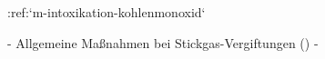 :ref:`m-intoxikation-kohlenmonoxid`
\begin{itemize}
    -   Allgemeine Maßnahmen bei
Stickgas-Vergiftungen
()
-   
\end{itemize}